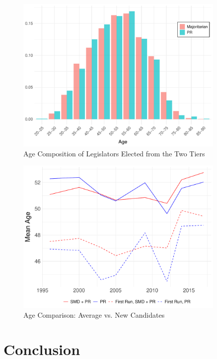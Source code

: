 \documentclass[a4paper, 11pt]{article}
\begin{document}
\begin{figure}[!htbp]
	\includegraphics[width = 0.9\textwidth]{../figure/paper/age_smd_vs_pr_winners.pdf}
	\caption{Age Composition of Legislators Elected from the Two Tiers}
	\label{fig:pr_vs_smd}
\end{figure}



\begin{figure}[!htbp]
	\includegraphics[width = 0.9\textwidth]{../figure/paper/age_first_run.pdf}
	\caption{Age Comparison: Average vs. New Candidates}
	\label{fig:ageFirstRun}
\end{figure}



\section{Conclusion}
\end{document}
